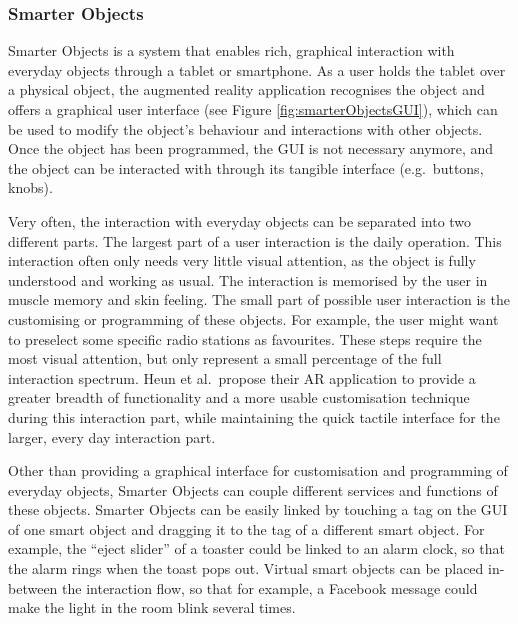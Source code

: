 \subsubsection{Smarter Objects}
\label{sec:smarterObjects}
Smarter Objects \cite{heun13smarter} is a system that enables rich, graphical interaction with everyday objects through a tablet or smartphone. 
As a user holds the tablet over a physical object, the augmented reality application recognises the object and offers a graphical user interface (see Figure \ref{fig:smarterObjectsGUI}), which can be used to modify the object's behaviour and interactions with other objects.
Once the object has been programmed, the GUI is not necessary anymore, and the object can be interacted with through its tangible interface (e.g.\ buttons, knobs).

Very often, the interaction with everyday objects can be separated into two different parts. 
The largest part of a user interaction is the daily operation. 
This interaction often only needs very little visual attention, as the object is fully understood and working as usual. 
The interaction is memorised by the user in muscle memory and skin feeling. 
The small part of possible user interaction is the customising or programming of these objects. 
For example, the user might want to preselect some specific radio stations as favourites. 
These steps require the most visual attention, but only represent a small percentage of the full interaction spectrum.
Heun et al.\ propose their AR application to provide a greater breadth of functionality and a more usable customisation technique during this interaction part, while maintaining the quick tactile interface for the larger, every day interaction part.

Other than providing a graphical interface for customisation and programming of everyday objects, Smarter Objects can couple different services and functions of these objects.
Smarter Objects can be easily linked by touching a tag on the GUI of one smart object and dragging it to the tag of a different smart object.
For example, the ``eject slider'' of a toaster could be linked to an alarm clock, so that the alarm rings when the toast pops out. 
Virtual smart objects can be placed in-between the interaction flow, so that for example, a Facebook message could make the light in the room blink several times.

